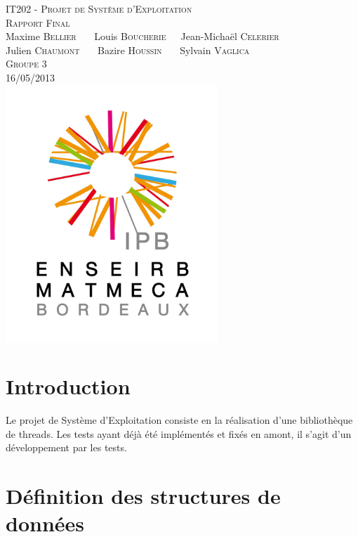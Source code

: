 \documentclass[a4paper,11pt]{article}
\begin{document}
\begin{titlepage}
  \begin{center}

    \textsc{IT202 - Projet de Système d'Exploitation}\\[2cm]
    \textsc{\large Rapport Final}\\[3cm]
    Maxime \textsc{Bellier} \ \ \ Louis \textsc{Boucherie}\ \ \ Jean-Michaël \textsc{Celerier}\\
    Julien \textsc{Chaumont} \ \ \ Bazire \textsc{Houssin} \ \ \ Sylvain \textsc{Vaglica}\\[1cm]
    \textsc{Groupe 3}\\[1.5cm]
    \textsc{\large 16/05/2013 }\\[1.5cm]
    \includegraphics[width=8cm]{logo.png}

  \end{center}
  \vspace{3cm}

\end{titlepage}

\clearpage

\section*{Introduction}

Le projet de Système d'Exploitation consiste en la réalisation d'une bibliothèque de threads. Les tests ayant déjà été implémentés et fixés en amont, il s'agit d'un développement par les tests.



\section{Définition des structures de données}
\end{document}
